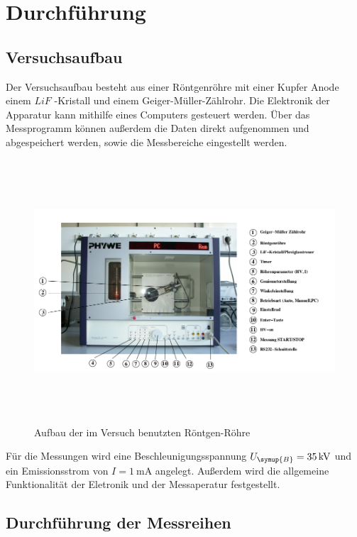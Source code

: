 \newpage
\section{Durchführung}
\label{sec:Durchführung}

\subsection{Versuchsaufbau}
\label{subsec:Versuchsaufbau}

Der Versuchsaufbau besteht aus einer Röntgenröhre mit einer Kupfer Anode einem
$LiF$ -Kristall und einem Geiger-Müller-Zählrohr. Die Elektronik der Apparatur kann
mithilfe eines Computers gesteuert werden. Über das Messprogramm können außerdem die
Daten direkt aufgenommen und abgespeichert werden, sowie die Messbereiche eingestellt
werden.
\begin{figure}[H]
  \centering
  \includegraphics[width=16.6cm,height=9.8cm]{Aufbau.png}
  \caption{Aufbau der im Versuch benutzten Röntgen-Röhre}
  \label{fig:Aufbau}
\end{figure}
Für die Messungen wird eine Beschleunigungsspannung $U_\symup{B} = \SI{35}{\kilo\volt}$ und ein
Emissionsstrom von $I = \SI{1}{\milli\ampere}$ angelegt. Außerdem wird die allgemeine Funktionalität
der Eletronik und der Messaperatur festgestellt.\\

\subsection{Durchführung der Messreihen}
\label{subsec:Messreihen}

